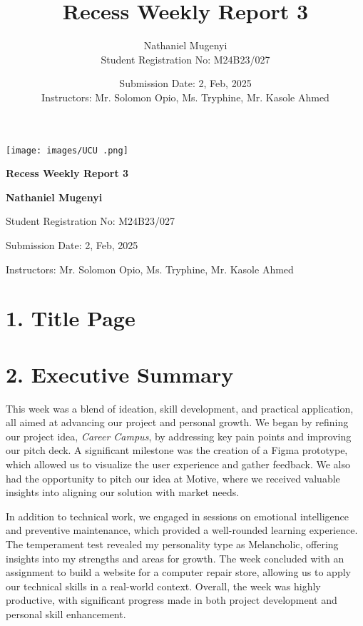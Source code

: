 \documentclass{article}
\title{Recess Weekly Report 3}
\author{Nathaniel Mugenyi \\ Student Registration No: M24B23/027}
\date{Submission Date: 2, Feb, 2025 \\ Instructors: Mr. Solomon Opio, Ms. Tryphine, Mr. Kasole Ahmed}
\begin{document}
\begin{titlepage}
    \centering
    \texttt{[image: images/UCU .png]} 
    \vspace{1cm}
    
    {\LARGE \textbf{Recess Weekly Report 3} \par}
    \vspace{1cm}
    
    {\large \textbf{Nathaniel Mugenyi} \par}
    {\large Student Registration No: M24B23/027 \par}
    \vspace{1cm}
    
    {\large Submission Date: 2, Feb, 2025 \par}
    {\large Instructors: Mr. Solomon Opio, Ms. Tryphine, Mr. Kasole Ahmed \par}
    \vfill
\end{titlepage}

\section*{1. Title Page}


\section*{2. Executive Summary}
This week was a blend of ideation, skill development, and practical application, all aimed at advancing our project and personal growth. We began by refining our project idea, \textit{Career Campus}, by addressing key pain points and improving our pitch deck. A significant milestone was the creation of a Figma prototype, which allowed us to visualize the user experience and gather feedback. We also had the opportunity to pitch our idea at Motive, where we received valuable insights into aligning our solution with market needs.

In addition to technical work, we engaged in sessions on emotional intelligence and preventive maintenance, which provided a well-rounded learning experience. The temperament test revealed my personality type as Melancholic, offering insights into my strengths and areas for growth. The week concluded with an assignment to build a website for a computer repair store, allowing us to apply our technical skills in a real-world context. Overall, the week was highly productive, with significant progress made in both project development and personal skill enhancement.
\end{document}
